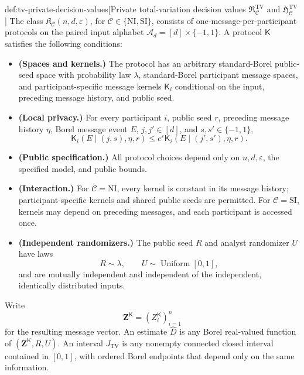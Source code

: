 \documentclass[11pt]{article}
\begin{document}
\begin{definitionv}{def:tv-private-decision-values}[Private total-variation decision values $\mathfrak R^{\mathrm{TV}}_{\mathcal C}$ and $\mathfrak H^{\mathrm{TV}}_{\mathcal C}$]
The class \(\mathfrak K_{\mathcal C}(n,d,\varepsilon)\), for \(\mathcal C\in\{\mathrm{NI},\mathrm{SI}\}\), consists of one-message-per-participant protocols on the paired input alphabet \(\mathcal A_d=[d]\times\{-1,1\}\). A protocol \(\mathsf K\) satisfies the following conditions:
\begin{itemize}
\item \textbf{(Spaces and kernels.)} The protocol has an arbitrary standard-Borel public-seed space with probability law \(\lambda\), standard-Borel participant message spaces, and participant-specific message kernels \(\mathsf K_i\) conditional on the input, preceding message history, and public seed.
\item \textbf{(Local privacy.)} For every participant \(i\), public seed \(r\), preceding message history \(\eta\), Borel message event \(E\), \(j,j'\in[d]\), and \(s,s'\in\{-1,1\}\),
\[
\mathsf K_i(E\mid(j,s),\eta,r)
\le e^\varepsilon\mathsf K_i(E\mid(j',s'),\eta,r).
\]
\item \textbf{(Public specification.)} All protocol choices depend only on \(n,d,\varepsilon\), the specified model, and public bounds.
\item \textbf{(Interaction.)} For \(\mathcal C=\mathrm{NI}\), every kernel is constant in its message history; participant-specific kernels and shared public seeds are permitted. For \(\mathcal C=\mathrm{SI}\), kernels may depend on preceding messages, and each participant is accessed once.
\item \textbf{(Independent randomizers.)} The public seed \(R\) and analyst randomizer \(U\) have laws
\[
R\sim\lambda,
\qquad
U\sim\operatorname{Uniform}[0,1],
\]
and are mutually independent and independent of the independent, identically distributed inputs.
\end{itemize}

Write
\[
\mathbf Z^{\mathsf K}=(Z_i^{\mathsf K})_{i=1}^n
\]
for the resulting message vector. An estimate \(\widehat D\) is any Borel real-valued function of \((\mathbf Z^{\mathsf K},R,U)\). An interval \(J_{\mathrm{TV}}\) is any nonempty connected closed interval contained in \([0,1]\), with ordered Borel endpoints that depend only on the same information.


\end{definitionv}
\end{document}

